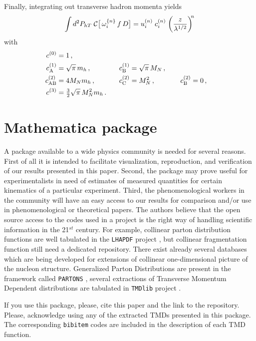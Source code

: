 \documentclass[a4paper,11pt]{article}
\newcommand{\be}{\begin{equation}}
\newcommand{\ee}{\end{equation}}
\def\Phperp{P_{hT}}
\begin{document}
Finally, integrating out transverse hadron momenta yields
\be
	\int d^2\Phperp\;
	{\cal C}\bigl[\,\omega^{\{n\}}_{i} \, f \, D \bigr]
	= u^{(n)}_{i} \;c^{(n)}_{i}\;\biggl(\frac{z}{\lambda^{1/2}}\biggr)^{\!\!n}
\ee
with
\begin{alignat}{7}
	c^{(0)}_{\rm  } 	&= 1 \, , \\
	c^{(1)}_{\rm A} 	&= \sqrt{\pi}\,m_h	\, , &
	c^{(1)}_{\rm B} 	&= \sqrt{\pi}\,M_N	\, , \\
	c^{(2)}_{\rm AB} 	&= 4M_Nm_h		\, , \;\;\;\;\;\; &
	c^{(2)}_{\rm C} 	&= M_N^2 		\, , \;\;\;\;\;\;\;\;\;\; &
	c^{(2)}_{\rm B}	&= 0 			\, ,\\
	c^{(3)}_{\rm  } 	&= {\textstyle\frac32}\sqrt{\pi} \,M_N^2m_h
	\, . \;\;\;     &
			&
	\label{Eq:Gaussian-integrals-working-IV}
\end{alignat}


\section{Mathematica package}
\label{app:package}

A package available to a wide physics community is needed for several
reasons. First of all it is intended to facilitate visualization,
reproduction, and verification of our results presented in this paper.
Second, the package may prove useful for experimentalists in need of
estimates of measured quantities for certain kinematics of a particular
experiment. Third, the phenomenological workers in the community
will have an easy access to our results for comparison and/or use in
phenomenological or theoretical papers. The authors believe that the
open source access to the codes used in a project is the right way of
handling scientific information in the 21$^{st}$ century. For example,
collinear parton distribution functions are well tabulated in
the \texttt{LHAPDF} project \cite{Buckley:2014ana}, but collinear
fragmentation function still need a dedicated repository. There exist
already several databases which are being developed for extensions
of collinear one-dimensional picture of the nucleon structure.
Generalized Parton Distributions are present in the framework
called \texttt{PARTONS} \cite{Berthou:2015oaw}, several extractions
of Transverse Momentum Dependent distributions are tabulated in
\texttt{TMDlib} project \cite{Hautmann:2014kza}.

If you use this package, please, cite this paper and the link to
the repository. Please, acknowledge using any of the extracted TMDs
presented in this package. The corresponding \texttt{bibitem}
codes are included in the description of each TMD function.
\end{document}
